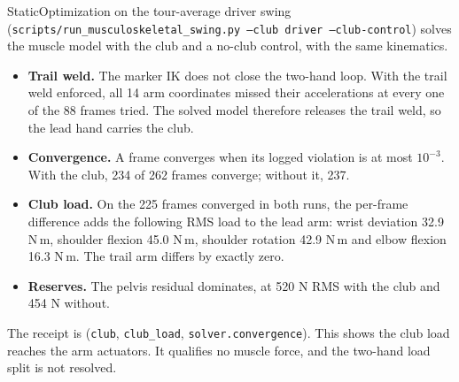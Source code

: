 \documentclass[11pt,a4paper]{article}
\begin{document}
StaticOptimization on the tour-average driver swing
(\texttt{scripts/run\_musculoskeletal\_swing.py --club driver
--club-control}) solves the muscle model with the club and a no-club
control, with the same kinematics.
\begin{itemize}
\item \textbf{Trail weld.} The marker IK does not close the two-hand loop.
  With the trail weld enforced, all 14 arm coordinates missed their
  accelerations at every one of the 88 frames tried. The solved model
  therefore releases the trail weld, so the lead hand carries the club.
\item \textbf{Convergence.} A frame converges when its logged violation is
  at most $10^{-3}$. With the club, 234 of 262 frames converge; without it,
  237.
\item \textbf{Club load.} On the 225 frames converged in both runs, the
  per-frame difference adds the following RMS load to the lead arm: wrist
  deviation 32.9 N\,m, shoulder flexion 45.0 N\,m, shoulder rotation
  42.9 N\,m and elbow flexion 16.3 N\,m. The trail arm differs by exactly
  zero.
\item \textbf{Reserves.} The pelvis residual dominates, at 520 N RMS with the
  club and 454 N without.
\end{itemize}
The receipt is
(\texttt{club}, \texttt{club\_load}, \texttt{solver.convergence}). This
shows the club load reaches the arm actuators. It qualifies no muscle force,
and the two-hand load split is not resolved.
\end{document}
